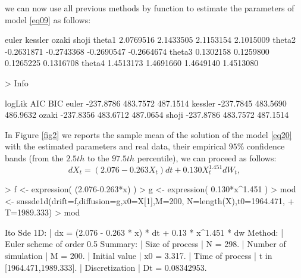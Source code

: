 we can now use all previous methods by  function to estimate the parameters of model \eqref{eq09} as follows:
\begin{Schunk}
\begin{Soutput}
            euler    kessler      ozaki      shoji
theta1  2.0769516  2.1433505  2.1153154  2.1015009
theta2 -0.2631871 -0.2743368 -0.2690547 -0.2664674
theta3  0.1302158  0.1259800  0.1265225  0.1316708
theta4  1.4513173  1.4691660  1.4649140  1.4513080
\end{Soutput}
\begin{Sinput}
> Info
\end{Sinput}
\begin{Soutput}
           logLik      AIC      BIC
euler   -237.8786 483.7572 487.1514
kessler -237.7845 483.5690 486.9632
ozaki   -237.8356 483.6712 487.0654
shoji   -237.8786 483.7572 487.1514
\end{Soutput}
\end{Schunk}
In Figure \ref{fig2} we reports the sample mean of the solution of the model \eqref{eq20} with the estimated parameters and real data, their empirical $95\%$ confidence bands (from the $2.5th$ to the $97.5th$ percentile), we can proceed as follows:
\begin{equation}\label{eq20}
  dX_{t} = (2.076-0.263 X_{t}) dt + 0.130 X_{t}^{1.451} dW_{t},
\end{equation}
\begin{Schunk}
\begin{Sinput}
> f <- expression( (2.076-0.263*x) )
> g <- expression( 0.130*x^1.451 )
> mod <- snssde1d(drift=f,diffusion=g,x0=X[1],M=200, N=length(X),t0=1964.471,
+                  T=1989.333)
> mod
\end{Sinput}
\begin{Soutput}
Ito Sde 1D:
	| dx = (2.076 - 0.263 * x) * dt + 0.13 * x^1.451 * dw
Method:
	| Euler scheme of order 0.5
Summary:
	| Size of process       | N  = 298.
	| Number of simulation  | M  = 200.
	| Initial value         | x0 = 3.317.
	| Time of process       | t in [1964.471,1989.333].
	| Discretization        | Dt = 0.08342953.
\end{Soutput}
\end{Schunk}
